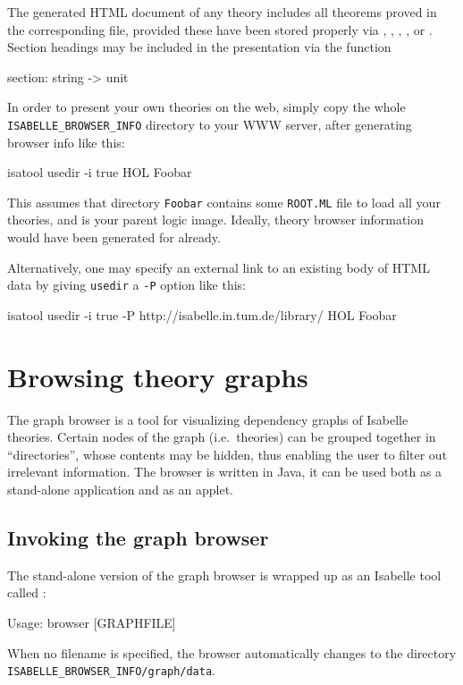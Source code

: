 \medskip

The generated HTML document of any theory includes all theorems proved in the
corresponding {\ML} file, provided these have been stored properly via
, , , , or
.  Section headings may be included in the presentation via
the {\ML} function
\begin{ttbox}
section: string -> unit
\end{ttbox}

\medskip

In order to present your own theories on the web, simply copy the whole
\texttt{ISABELLE_BROWSER_INFO} directory to your WWW server, after generating
browser info like this:
\begin{ttbox}
isatool usedir -i true HOL Foobar
\end{ttbox}
This assumes that directory \texttt{Foobar} contains some \texttt{ROOT.ML}
file to load all your theories, and {\HOL} is your parent logic image.
Ideally, theory browser information would have been generated for {\HOL}
already.

Alternatively, one may specify an external link to an existing body of HTML
data by giving \texttt{usedir} a \texttt{-P} option like this:
\begin{ttbox}
isatool usedir -i true -P http://isabelle.in.tum.de/library/ HOL Foobar
\end{ttbox}


\section{Browsing theory graphs} \label{sec:browse}

The graph browser is a tool for visualizing dependency graphs of
Isabelle theories. Certain nodes of the graph (i.e.~theories) can be
grouped together in ``directories'', whose contents may be hidden,
thus enabling the user to filter out irrelevant information.  The
browser is written in Java, it can be used both as a stand-alone
application and as an applet.


\subsection{Invoking the graph browser}

The stand-alone version of the graph browser is wrapped up as an
Isabelle tool called :
\begin{ttbox}
Usage: browser [GRAPHFILE]
\end{ttbox}
When no filename is specified, the browser automatically changes to
the directory \texttt{ISABELLE_BROWSER_INFO/graph/data}.

